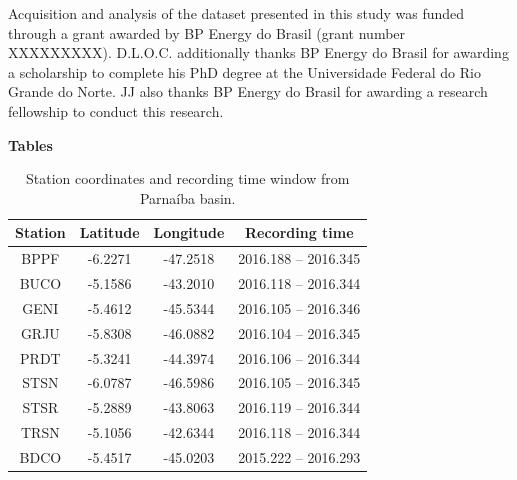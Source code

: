 \documentclass[paper,11pt]{geophysics}
\begin{document}
Acquisition and analysis of the dataset presented in this study was funded through a grant awarded by BP Energy do Brasil (grant number XXXXXXXXX). D.L.O.C. additionally thanks BP Energy do Brasil for awarding a scholarship to complete his PhD degree at the Universidade Federal do Rio Grande do Norte. JJ also thanks BP Energy do Brasil for awarding a research fellowship to conduct this research.
\linebreak
\linebreak




\pagebreak

\begin{flushleft}
\textbf{\LARGE Tables}
\end{flushleft}

\begin{table}[! htpb]
\centering
	\small
	\begin{threeparttable}
	\caption{Station coordinates and recording time window from Parnaíba basin.}
	\begin{tabular}{c c c c}
    \hline
    Station & Latitude & Longitude & Recording time \\ \hline
    BPPF & -6.2271 & -47.2518 & 2016.188 – 2016.345 \\
	BUCO & -5.1586 & -43.2010 & 2016.118 – 2016.344 \\
	GENI & -5.4612 & -45.5344 & 2016.105 – 2016.346 \\
	GRJU & -5.8308 & -46.0882 & 2016.104 – 2016.345 \\
	PRDT & -5.3241 & -44.3974 & 2016.106 – 2016.344 \\
	STSN & -6.0787 & -46.5986 & 2016.105 – 2016.345 \\
	STSR & -5.2889 & -43.8063 & 2016.119 – 2016.344 \\
	TRSN & -5.1056 & -42.6344 & 2016.118 – 2016.344 \\
	BDCO & -5.4517 & -45.0203 & 2015.222 – 2016.293 \\ \hline
    \end{tabular}
    \label{tabela_estacoes}
	\end{threeparttable}
\end{table}
\pagebreak
\end{document}
